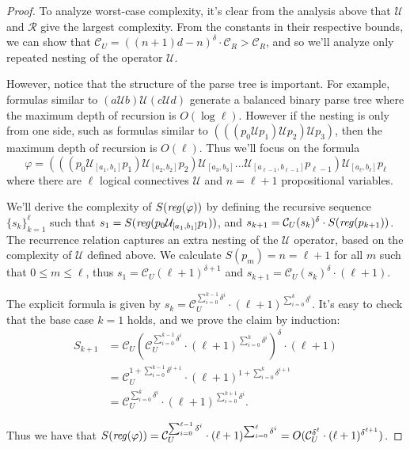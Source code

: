\documentclass[runningheads]{llncs}
\renewcommand{\phi}{\varphi}
\begin{document}
\begin{proof}
    To analyze worst-case complexity, it's clear from the analysis above that $\mathcal{U}$ and $\mathcal{R}$ give the largest complexity. From the constants in their respective bounds, we can show that $\mathcal{C}_U = ((n+1)d - n)^\delta \cdot \mathcal{C}_R > \mathcal{C}_R$, and so we'll analyze only repeated nesting of the operator $\mathcal{U}$.
    
    However, notice that the structure of the parse tree is important. For example, formulas similar to $(a \mathcal{U} b) \mathcal{U} (c \mathcal{U} d)$ generate a balanced binary parse tree where the maximum depth of recursion is $O(\log \ell)$. However if the nesting is only from one side, such as formulas similar to $(((p_0 \mathcal{U} p_1) \mathcal{U} p_2) \mathcal{U} p_3)$, then the maximum depth of recursion is $O(\ell)$. Thus we'll focus on the formula $$\phi = (((p_0 \mathcal{U}_{[a_1, b_1]} p_1) \mathcal{U}_{[a_2, b_2]} p_2) \mathcal{U}_{[a_3, b_3]}... \mathcal{U}_{[a_{\ell - 1}, b_{\ell - 1}]} p_{\ell - 1}) \mathcal{U}_{[a_\ell, b_\ell]} p_\ell$$ where there are $\ell$ logical connectives $\mathcal{U}$ and $n = \ell + 1$ propositional variables. 
    
    We'll derive the complexity of $S(\text{\emph{reg}}(\phi))$ by defining the recursive sequence $\{s_k\}_{k = 1}^\ell$ such that $s_1 = S(\text{\emph{reg}}(p_0 \mathcal{U}_{[a_1, b_1]} p_1))$, and $s_{k+1} = \mathcal{C}_U (s_k)^\delta \cdot S(\text{\emph{reg}}(p_{k+1}))$. The recurrence relation captures an extra nesting of the $\mathcal{U}$ operator, based on the complexity of $\mathcal{U}$ defined above. We calculate $S(p_m) = n = \ell + 1$ for all $m$ such that $0 \leq m \leq \ell$, thus $s_1 = \mathcal{C}_U(\ell + 1)^{\delta + 1}$ and $s_{k+1} = \mathcal{C}_U (s_k)^\delta \cdot (\ell + 1)$. 
    
    The explicit formula is given by $s_k = \mathcal{C}_U^{\sum_{i = 0}^{k - 1} \delta^i} \cdot (\ell + 1)^{\sum_{i = 0}^{k} \delta^i}$. It's easy to check that the base case $k = 1$ holds, and we prove the claim by induction:
    \begin{align*}
        S_{k + 1} &= \mathcal{C}_U (\mathcal{C}_U^{\sum_{i = 0}^{k - 1} \delta^i} \cdot (\ell + 1)^{\sum_{i = 0}^{k} \delta^i}) ^ \delta \cdot (\ell + 1) \\
        &= \mathcal{C}_U^{1 + \sum_{i = 0}^{k - 1} \delta^{i + 1}} \cdot (\ell + 1)^{1 + \sum_{i = 0}^{k} \delta^{i + 1}} \\
        &= \mathcal{C}_U^{\sum_{i = 0}^k \delta^i} \cdot (\ell + 1)^{\sum_{i = 0}^{k+1} \delta^i}.
    \end{align*}
    
    \noindent Thus we have that $S(\text{\emph{reg}}(\phi)) = \mathcal{C}_U^{\sum_{i = 0}^{\ell - 1} \delta^i} \cdot (\ell + 1)^{\sum_{i = 0}^{\ell} \delta^i} = O(\mathcal{C}_U^{\delta ^ \ell} \cdot (\ell + 1)^{\delta^{\ell + 1}})$.
    
 \end{proof}
\end{document}
